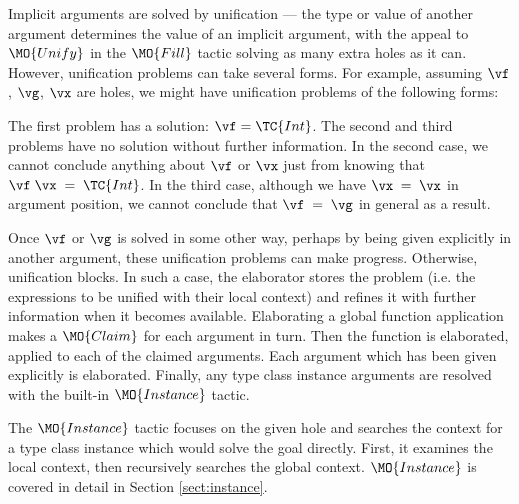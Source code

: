 Implicit arguments are solved by unification
--- the type or value of another argument determines the value of an implicit argument,
with the appeal to $\MO{Unify}$ in the $\MO{Fill}$ tactic solving as many extra holes
as it can. However, unification problems can take several forms. For example, assuming
$\vf$, $\vg$, $\vx$ are holes, we might have unification problems of the following
forms:


The first problem has a solution: $\vf=\TC{Int}$. The second and third problems
have no solution without further information. In the second case, we cannot
conclude anything about $\vf$ or $\vx$ just from knowing that
$\vf\;\vx\;=\;\TC{Int}$.  In the third case, although we have $\vx\;=\;\vx$ in
argument position, we cannot conclude that $\vf\;=\;\vg$ in general as a
result.

Once $\vf$ or $\vg$ is solved in some other way, perhaps by being given
explicitly in another argument, these unification problems can make progress.
Otherwise, unification blocks.  In such a case, the elaborator stores the
problem (i.e. the expressions to be unified with their local context) and
refines it with further information when it becomes available. 
Elaborating a global function application makes a $\MO{Claim}$ for each
argument in turn. Then the function is elaborated, applied to each of the
claimed arguments. Each argument which has been given explicitly is
elaborated. 
Finally, any type class instance arguments are resolved with the
built-in $\MO{Instance}$ tactic.


The $\MO{Instance}$ tactic focuses on the given hole and searches the context for
a type class instance which would solve the goal directly. First, it examines the local
context, then recursively searches the global context. $\MO{Instance}$ is covered
in detail in Section \ref{sect:instance}.


